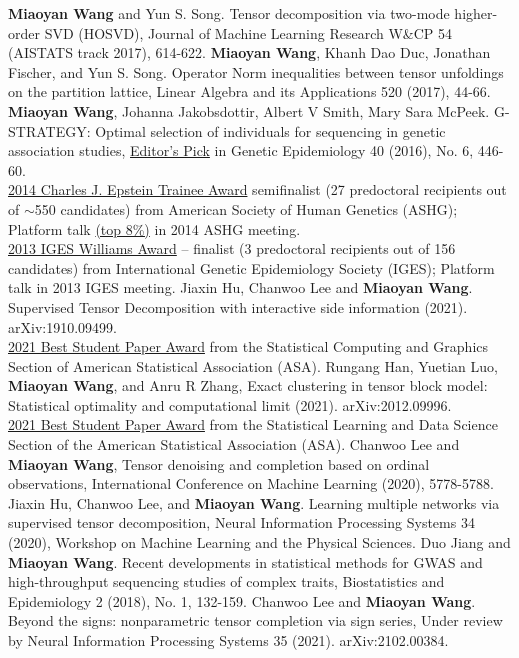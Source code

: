 \documentclass[11pt]{article}
\theoremstyle{exampstyle}
\theoremstyle{definition}
\begin{document}
{\begin{thebibliography}{9}
 {\bf Miaoyan Wang} and Yun S. Song. Tensor decomposition via two-mode higher-order SVD (HOSVD), Journal of Machine Learning Research W\&CP 54 (AISTATS track 2017), 614-622.
 {\bf Miaoyan Wang}, Khanh Dao Duc, Jonathan Fischer, and Yun S. Song. Operator Norm inequalities between tensor unfoldings on the partition lattice, Linear Algebra and its Applications 520 (2017), 44-66.
 {\bf Miaoyan Wang}, Johanna Jakobsdottir, Albert V Smith, Mary Sara McPeek. G-STRATEGY: Optimal selection of individuals for sequencing in genetic association studies, \underline{Editor’s Pick} in Genetic Epidemiology 40 (2016), No. 6, 446-60. \\
\underline{2014 Charles J. Epstein Trainee Award} semifinalist (27 predoctoral recipients out of $\sim$550 candidates) from American Society of Human Genetics (ASHG); Platform talk \underline{(top 8\%)} in 2014 ASHG meeting.  \\
\underline{2013 IGES Williams Award} -- finalist (3 predoctoral recipients out of 156 candidates) from International Genetic Epidemiology Society (IGES); Platform talk in 2013 IGES meeting. 
 Jiaxin Hu, Chanwoo Lee and {\bf Miaoyan Wang}. Supervised Tensor Decomposition with interactive side information (2021). arXiv:1910.09499. \\
\underline{2021 Best Student Paper Award} from the Statistical Computing and Graphics Section of American Statistical Association (ASA).
 Rungang Han, Yuetian Luo, {\bf Miaoyan Wang}, and Anru R Zhang, Exact clustering in tensor block model: Statistical optimality and computational limit (2021).  arXiv:2012.09996. \\
\underline{2021 Best Student Paper Award} from the Statistical Learning and Data Science Section of the American Statistical Association (ASA).
 Chanwoo Lee and {\bf Miaoyan Wang}, Tensor denoising and completion based on ordinal observations, International Conference on Machine Learning (2020), 5778-5788.
 Jiaxin Hu, Chanwoo Lee, and {\bf Miaoyan Wang}. Learning multiple networks via supervised tensor decomposition, Neural Information Processing Systems 34 (2020), Workshop on Machine Learning and the Physical Sciences. 
 Duo Jiang and {\bf Miaoyan Wang}. Recent developments in statistical methods for GWAS and high-throughput sequencing studies of complex traits, Biostatistics and Epidemiology 2 (2018), No. 1, 132-159.
 Chanwoo Lee and {\bf Miaoyan Wang}. Beyond the signs: nonparametric tensor completion via sign series, Under review by Neural Information Processing Systems 35 (2021). arXiv:2102.00384.

\end{thebibliography}}
\end{document}
